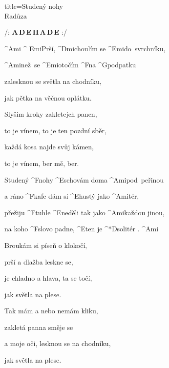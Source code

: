 \begin{song}{title=\predtitle\centering Studený nohy \\\large Radůza\vspace*{-0.3cm}}  %
\begin{centerjustified}
\nejvetsi

\predehra 
/: \textbf{A\,D\,E\,H\,A\,D\,E} :/

\sloka
	^{Ami} ^ {Emi}Prší, ^{Dmi\z}choulím se ^{Emi\z}do~svrchníku,

	^{Ami\z}než~se ^{Emi\z}otočím ^{F}na ^{G}podpatku
	
	zalesknou se světla na chodníku,
   	
   	jak pětka na věčnou oplátku.

\sloka
	Slyším kroky zakletejch panen,
   	
   	to je vínem, to je ten pozdní sběr,
   
   	každá kosa najde svůj kámen,
   	
   	to je vínem, ber mě, ber.

	Studený ^{F\z}nohy ^{E\z}schovám doma ^{Ami\z}pod~peřinou

	a ráno ^{F\z}kafe dám si ^{E\z}hustý jako ^{Ami\z}tér,\:\:\:\:

	přežiju ^{F\z}tuhle ^{\z E}neděli tak jako ^{Ami\z}každou jinou,

	na koho ^{F\z}slovo padne, ^{E}ten je ^*{\z D}solitér . ^{Ami} 

\sloka
	Broukám si píseň o klokočí,
   	
   	prší a dlažba leskne se,
   	
   	je chladno a hlava, ta se točí,
   	
   	jak světla na plese.


\sloka
	Tak mám a nebo nemám kliku,
   
   	zakletá panna směje se
   	
   	a moje oči, lesknou se na chodníku,
   	
   	jak světla na plese.


\end{centerjustified}
\setcounter{Slokočet}{0}
\end{song}
